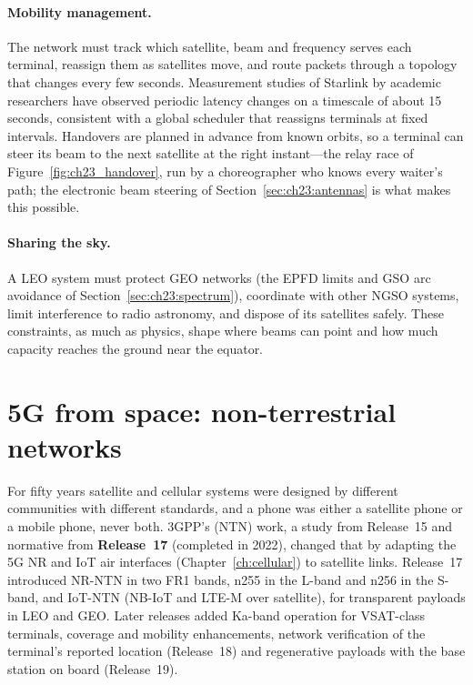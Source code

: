 \paragraph{Mobility management.} The network must track which satellite, beam and frequency serves
each terminal, reassign them as satellites move, and route packets through a topology that changes
every few seconds. Measurement studies of Starlink by academic researchers have observed periodic
latency changes on a timescale of about 15 seconds, consistent with a global scheduler that
reassigns terminals at fixed intervals. Handovers are planned in advance from known orbits, so a
terminal can steer its beam to the next satellite at the right instant---the relay race of
Figure~\ref{fig:ch23_handover}, run by a choreographer who knows every waiter's path; the electronic
beam steering of Section~\ref{sec:ch23:antennas} is what makes this possible.

\paragraph{Sharing the sky.} A LEO system must protect GEO networks (the EPFD limits and GSO arc
avoidance of Section~\ref{sec:ch23:spectrum}), coordinate with other NGSO systems, limit
interference to radio astronomy, and dispose of its satellites safely. These constraints, as much
as physics, shape where beams can point and how much capacity reaches the ground near the
equator.

\section{5G from space: non-terrestrial networks}
\label{sec:ch23:ntn}

For fifty years satellite and cellular systems were designed by different communities with
different standards, and a phone was either a satellite phone or a mobile phone, never both. 3GPP's
 (NTN) work, a study from Release~15 and normative from
\textbf{Release~17} (completed in 2022), changed that by adapting the 5G NR and IoT air interfaces
(Chapter~\ref{ch:cellular}) to satellite links. Release~17 introduced NR-NTN in two FR1 bands, n255
in the L-band and n256 in the S-band, and IoT-NTN (NB-IoT and LTE-M over satellite), for
transparent payloads in LEO and GEO. Later releases added Ka-band operation for VSAT-class
terminals, coverage and mobility enhancements, network verification of the terminal's reported
location (Release~18) and regenerative payloads with the base station on board (Release~19).


